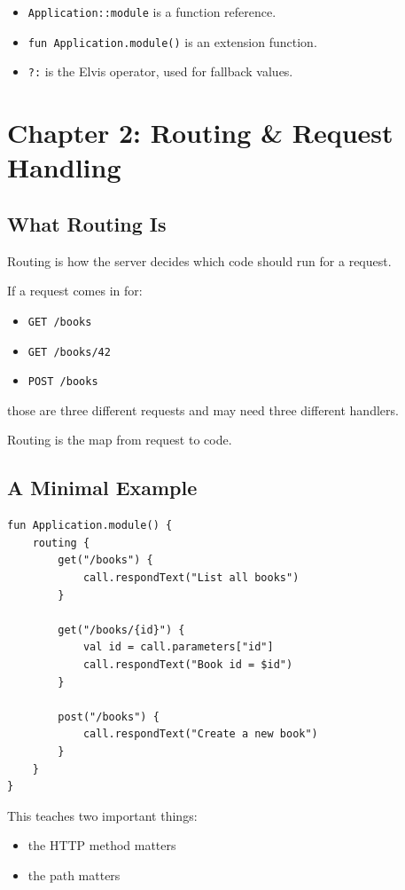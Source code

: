 \documentclass[11pt,a4paper]{article}
\begin{document}
\begin{itemize}
    \item \texttt{Application::module} is a function reference.
    \item \texttt{fun Application.module()} is an extension function.
    \item \texttt{?:} is the Elvis operator, used for fallback values.
\end{itemize}

\section{Chapter 2: Routing \& Request Handling}

\subsection{What Routing Is}

Routing is how the server decides which code should run for a request.

If a request comes in for:
\begin{itemize}
    \item \texttt{GET /books}
    \item \texttt{GET /books/42}
    \item \texttt{POST /books}
\end{itemize}

those are three different requests and may need three different handlers.

Routing is the map from request to code.

\subsection{A Minimal Example}

\begin{lstlisting}[style=kazekotlin]
fun Application.module() {
    routing {
        get("/books") {
            call.respondText("List all books")
        }

        get("/books/{id}") {
            val id = call.parameters["id"]
            call.respondText("Book id = $id")
        }

        post("/books") {
            call.respondText("Create a new book")
        }
    }
}
\end{lstlisting}

This teaches two important things:
\begin{itemize}
    \item the HTTP method matters
    \item the path matters
\end{itemize}
\end{document}
